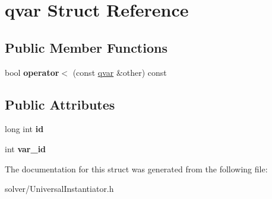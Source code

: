 \hypertarget{structqvar}{\section{qvar \-Struct \-Reference}
\label{structqvar}
}
\subsection*{\-Public \-Member \-Functions}
\begin{DoxyCompactItemize}
\item 
\hypertarget{structqvar_aca3d02f8800c57b7e4e474305bb70b03}{bool {\bfseries operator$<$} (const \hyperlink{structqvar}{qvar} \&other) const }\label{structqvar_aca3d02f8800c57b7e4e474305bb70b03}

\end{DoxyCompactItemize}
\subsection*{\-Public \-Attributes}
\begin{DoxyCompactItemize}
\item 
\hypertarget{structqvar_a8e0639b72797b150e0c2c39b6a76c118}{long int {\bfseries id}}\label{structqvar_a8e0639b72797b150e0c2c39b6a76c118}

\item 
\hypertarget{structqvar_a20f7da0b88ce7f066a2d05ac995fac9c}{int {\bfseries var\-\_\-id}}\label{structqvar_a20f7da0b88ce7f066a2d05ac995fac9c}

\end{DoxyCompactItemize}


\-The documentation for this struct was generated from the following file\-:\begin{DoxyCompactItemize}
\item 
solver/\-Universal\-Instantiator.\-h\end{DoxyCompactItemize}
